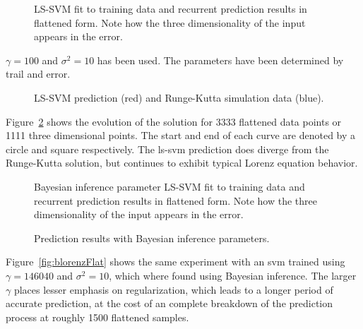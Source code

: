 \begin{figure}
\centering
\tikzset{mark size=1}


\caption{LS-SVM fit to training data and recurrent prediction results in flattened form. Note how the three dimensionality of the input appears in the error.}
\label{fig:lorenzFlat}
\end{figure}
$\gamma = 100$ and $\sigma^2 = 10$ has been used. The parameters have been determined by trail and error. 
\begin{figure}
\centering

\caption{LS-SVM prediction (red) and Runge-Kutta simulation data (blue).}
\label{fig:lorenzPred3d}
\end{figure}
Figure~\ref{fig:lorenzPred3d} shows the evolution of the solution for 3333 flattened data points or 1111 three dimensional points. The start and end of each curve are denoted by a circle and square respectively. The ls-svm prediction does diverge from the Runge-Kutta solution, but continues to exhibit typical Lorenz equation behavior.
\begin{figure}
\centering
\tikzset{mark size=1}


\caption{Bayesian inference parameter LS-SVM fit to training data and recurrent prediction results in flattened form. Note how the three dimensionality of the input appears in the error.}
\label{fig:blorenzFlat}

\caption{Prediction results with Bayesian inference parameters.}
\label{fig:blorenzPred3d}
\end{figure}
Figure~\ref{fig:blorenzFlat} shows the same experiment with an svm trained using $\gamma = 146040$ and $\sigma^2 = 10$, which where found using Bayesian inference. The larger $\gamma$ places lesser emphasis on regularization, which leads to a longer period of accurate prediction, at the cost of an complete breakdown of the prediction process at roughly 1500 flattened samples. 

